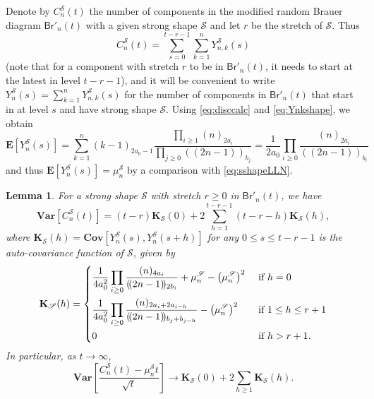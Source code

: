 \documentclass[a4paper,11pt,reqno]{amsart}
\newcommand{\bE}{\mathbf{E}}
\newcommand{\bVar}{\mathbf{Var}}
\newcommand{\bCov}{\mathbf{Cov}}
\newcommand{\Br}{\mathsf{Br}}
\newcommand{\shape}{\mathscr{S}}
\newcommand{\fdf}[1]{(\!(#1)\!)}
\newcommand{\mb}{\mathbf}
\newtheorem{lemma}{Lemma}
\theoremstyle{definition}
\begin{document}
Denote by $C_n^\shape(t)$ the number of components in the modified random Brauer diagram $\Br'_n(t)$ with a given strong shape $\shape$ and let $r$ be the stretch of $\shape$. Thus 
\[
 C_n^\shape(t) = \sum_{s=0}^{t-r-1} \sum_{k=1}^n Y_{n,k}^\shape(s)
\]
(note that for a component with stretch $r$ to be in $\Br'_n(t)$, it needs to start at the latest in level $t-r-1$),
and it will be convenient to write $Y_n^\shape(s) = \sum_{k=1}^n Y_{n,k}^\shape(s)$ for the number of components in $\Br'_n(t)$ that start in at level $s$ and have strong shape $\shape$. Using \eqref{eq:disccalc} and \eqref{eq:Ynkshape}, we obtain
\begin{equation}\label{eq:Ynshape}
 \bE\left[Y_n^\shape(s)\right] 
 = \sum_{k=1}^n (k-1)_{2a_0-1}\frac{\prod_{i\geq 1} (n)_{2a_i}}{\prod_{j\geq 0} \fdf{2n-1}_{b_j}} 
 = \frac{1}{2a_0}\prod_{i\geq 0} \frac{(n)_{2a_i}}{\fdf{2n-1}_{b_i}}
\end{equation}
and thus $\bE\left[Y_n^\shape(s)\right]=\mu_n^\shape$ by a comparison with \eqref{eq:sshapeLLN}.

\begin{lemma}\label{lemma:shapeVar}
 For a strong shape $\shape$ with stretch $r\geq 0$ in $\Br'_n(t)$, we have 
 \begin{equation}\label{eq:shapeVar}
  \bVar\left[C_n^\shape(t)\right] = (t-r)\mb K_\shape(0) + 2\sum_{h=1}^{t-r-1} (t-r-h) \mb K_\shape(h),
 \end{equation}
 where $\mb K_\shape(h)=\bCov\left[Y_n^\shape(s),Y_n^\shape(s+h)\right]$ for any $0\leq s\leq t-r-1$ is the auto-covariance function of $\shape$, given by 
 \begin{equation}\label{eq:autocov}
  \mb K_\shape(h) =   
     \begin{dcases}
      \frac{1}{4a_0^2}\prod_{i\geq0}\frac{(n)_{4a_i}}{\fdf{2n-1}_{2b_i}} +\mu_n^\shape - \big(\mu_n^\shape\big)^2 & \text{ if $h=0$}\\
      \frac{1}{4a_0^2} \prod_{i\geq0} \frac{(n)_{2a_i+2a_{i-h}}}{\fdf{2n-1}_{b_j+b_{j-h}}} - \big(\mu_n^\shape\big)^2 & \text{ if $1\leq h\leq r+1$}\\
      0 & \text{ if $h>r+1$}.
     \end{dcases}
 \end{equation}
 In particular, as $t\to\infty$,
 \begin{equation}\label{eq:shapelimVar}
  \bVar\left[\frac{C_n^\shape(t)-\mu_n^\shape t}{\sqrt{t}}\right] \to \mb K_\shape(0) + 2 \sum_{h\geq 1} \mb K_\shape(h).
 \end{equation}
\end{lemma}
\end{document}
